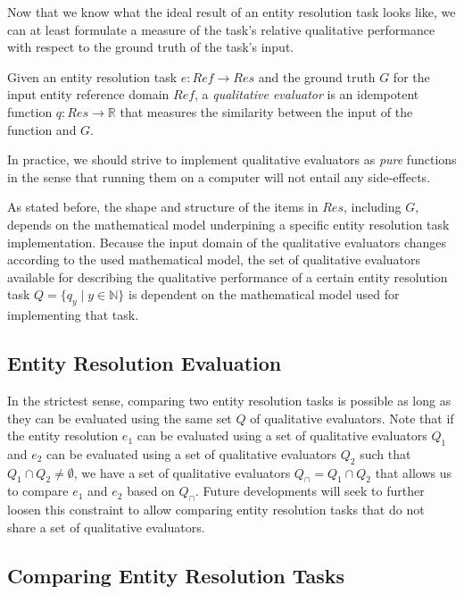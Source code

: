\documentclass[11pt]{article}
\begin{document}
    Now that we know what the ideal result of an entity resolution task looks
    like, we can at least formulate a measure of the task's relative qualitative
    performance with respect to the ground truth of the task's input.
    
    \begin{defn}
    Given an entity resolution task $e: Ref \rightarrow Res$ and the ground
    truth $G$ for the input entity reference domain $Ref$, a \textit{qualitative
    evaluator} is an idempotent function $q: Res \rightarrow \mathbb{R}$ that
    measures the similarity between the input of the function and $G$.
    \end{defn}

    In practice, we should strive to implement qualitative evaluators as
    \textit{pure} functions in the sense that running them on a computer will
    not entail any side-effects.

    As stated before, the shape and structure of the items in $Res$, including
    $G$, depends on the mathematical model underpining a specific entity
    resolution task implementation.
    Because the input domain of the qualitative evaluators changes according to
    the used mathematical model, the set of qualitative evaluators available for
    describing the qualitative performance of a certain entity resolution task
    $Q = \{q_y \mid y \in \mathbb{N}\}$ is dependent on the mathematical model
    used for implementing that task.

    \subsection[ere]{Entity Resolution Evaluation}\label{sec:ere}

    In the strictest sense, comparing two entity resolution tasks is possible as
    long as they can be evaluated using the same set $Q$ of qualitative
    evaluators.
    Note that if the entity resolution $e_1$ can be evaluated using a set of
    qualitative evaluators $Q_1$ and $e_2$ can be evaluated using a set of
    qualitative evaluators $Q_2$ such that $Q_1 \cap Q_2 \neq \emptyset$, we
    have a set of qualitative evaluators $Q_\cap = Q_1 \cap Q_2$ that allows us
    to compare $e_1$ and $e_2$ based on $Q_\cap$.
    Future developments will seek to further loosen this constraint to allow
    comparing entity resolution tasks that do not share a set of qualitative
    evaluators.

    \subsection[cert]{Comparing Entity Resolution Tasks}\label{subsec:cert}
\end{document}
